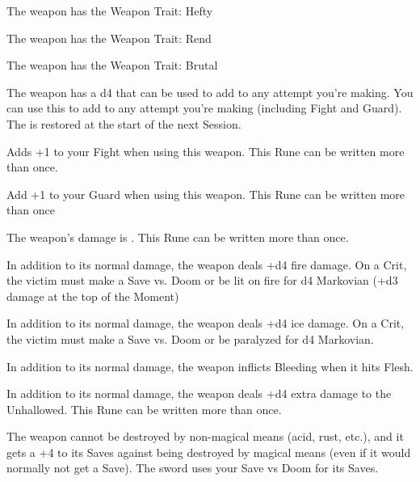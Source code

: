 {

The weapon has the Weapon Trait: Hefty


The weapon has the Weapon Trait: Rend


The weapon has the Weapon Trait: Brutal


The weapon has a d4 \UD that can be used to add to any \RO attempt you're making. You can use this \UD to add to any \RO attempt you're making (including Fight and Guard).  The \UD is restored at the start of the next Session.





Adds +1 to your Fight \RO when using this weapon.  This Rune can be written more than once.



Add +1 to your Guard \RO when using this weapon.  This Rune can be written more than once



The weapon's damage is \DCUP.  This Rune can be written more than once.



In addition to its normal damage, the weapon deals +d4 fire damage.  On a Crit, the victim must make a Save vs. Doom or be lit on fire for d4 Markovian (+d3 damage at the top of the Moment)



In addition to its normal damage, the weapon deals +d4 ice damage.  On a Crit, the victim must make a Save vs. Doom or be paralyzed for d4 Markovian.



In addition to its normal damage, the weapon inflicts Bleeding when it hits Flesh.






In addition to its normal damage, the weapon deals +d4 extra damage to the Unhallowed.  This Rune can be written more than once.



The weapon cannot be destroyed by non-magical means (acid, rust, etc.), and it gets a +4 to its Saves against being destroyed by magical means (even if it would normally not get a Save).  The sword uses your Save vs Doom for its Saves.

}
